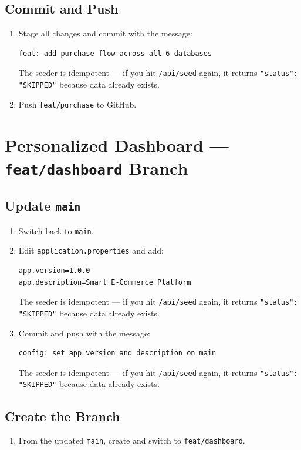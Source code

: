 \documentclass[a4paper]{article}
\begin{document}
\subsection*{Commit and Push}
\begin{enumerate}
  \item Stage all changes and commit with the message:
    \begin{verbatim}
feat: add purchase flow across all 6 databases
    \end{verbatim}
    The seeder is idempotent --- if you hit \texttt{/api/seed} again, it returns \texttt{"status": "SKIPPED"} because data already exists.
  \item Push \texttt{feat/purchase} to GitHub.
\end{enumerate}

\section{Personalized Dashboard --- \texttt{feat/dashboard} Branch}

\subsection*{Update \texttt{main}}
\begin{enumerate}
  \item Switch back to \texttt{main}.
  \item Edit \texttt{application.properties} and add:
    \begin{verbatim}
app.version=1.0.0
app.description=Smart E-Commerce Platform
    \end{verbatim}
    The seeder is idempotent --- if you hit \texttt{/api/seed} again, it returns \texttt{"status": "SKIPPED"} because data already exists.
  \item Commit and push with the message:
    \begin{verbatim}
config: set app version and description on main
    \end{verbatim}
    The seeder is idempotent --- if you hit \texttt{/api/seed} again, it returns \texttt{"status": "SKIPPED"} because data already exists.
\end{enumerate}

\subsection*{Create the Branch}
\begin{enumerate}
  \item From the updated \texttt{main}, create and switch to \texttt{feat/dashboard}.
\end{enumerate}
\end{document}
